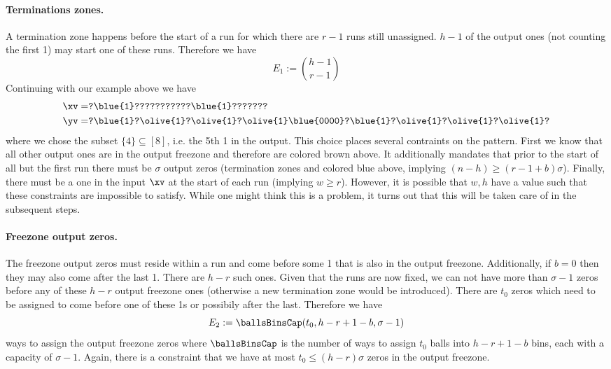 \paragraph{Terminations zones.} A termination zone happens before the start of a run for which there are $r-1$ runs still unassigned. $h-1$ of the output ones (not counting the first 1) may start one of these runs. Therefore we have 
$$
E_1:=\binom{h-1}{r-1}
$$
Continuing with our example above we have
\begin{align*}
    \xv=&\texttt{?\blue{1}???????????\blue{1}???????}\\
    \yv=&\texttt{?\blue{1}?\olive{1}?\olive{1}?\olive{1}\blue{0000}?\blue{1}?\olive{1}?\olive{1}?\olive{1}?}
\end{align*}
where we chose the subset $\{4\}\subseteq[8]$, i.e. the 5th 1 in the output. This choice places several contraints on the pattern. First we know that all other output ones are in the output freezone and therefore are colored brown above. It additionally mandates that prior to the start of all but the first run there must be $\sigma$ output zeros (termination zones and colored blue above, implying $(n-h)\geq (r-1+b)\sigma$). Finally, there must be a one in the input $\xv$ at the start of each run (implying $w\geq r$). However, it is possible that $w,h$ have a value such that these constraints are impossible to satisfy. While one might think this is a problem, it turns out that this will be taken care of in the subsequent steps.

\paragraph{Freezone output zeros.} The freezone output zeros must reside within a run and come before some 1 that is also in the output freezone. Additionally, if $b=0$ then they may also come after the last 1. There are $h-r$ such ones. Given that the runs are now fixed, we can not have more than $\sigma-1$ zeros before any of these $h-r$ output freezone ones (otherwise a new termination zone would be introduced). There are $t_0$ zeros which need to be assigned to come before one of these 1s or possibily after the last. Therefore we have
$$
    E_2:=\ballsBinsCap(t_0, h-r + 1-b, \sigma-1)
$$
ways to assign the output freezone zeros where $\ballsBinsCap$ is the number of ways to assign $t_0$ balls into $h-r+ 1-b$ bins, each with a capacity of $\sigma-1$.
Again, there is a constraint that we have at most $t_0\leq (h-r)\sigma$ zeros in the output freezone.


